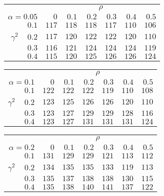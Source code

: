 \begin{tabular}{r|rrrrrr}
\hline\hline
 &\multicolumn{6}{c}{$\rho$} \\ 
 $\alpha = 0.05$ & $0$ & $0.1$ & $0.2$ & $0.3$ & $0.4$ & $0.5$ \\ 
 \hline$0.1$ & $117$ & $118$ & $118$ & $117$ & $110$ & $106$\\ 
$\gamma^2\;\;\;$ $0.2$ & $117$ & $120$ & $122$ & $122$ & $120$ & $110$\\ 
$0.3$ & $116$ & $121$ & $124$ & $124$ & $124$ & $119$\\ 
$0.4$ & $115$ & $120$ & $125$ & $126$ & $126$ & $124$\\ 
 \hline 
 \end{tabular}
 
 \vspace{2em} 
 
\begin{tabular}{r|rrrrrr}
\hline\hline
 &\multicolumn{6}{c}{$\rho$} \\ 
 $\alpha = 0.1$ & $0$ & $0.1$ & $0.2$ & $0.3$ & $0.4$ & $0.5$ \\ 
 \hline$0.1$ & $122$ & $122$ & $122$ & $119$ & $110$ & $108$\\ 
$\gamma^2\;\;\;$ $0.2$ & $123$ & $125$ & $126$ & $126$ & $120$ & $110$\\ 
$0.3$ & $123$ & $127$ & $129$ & $129$ & $128$ & $116$\\ 
$0.4$ & $123$ & $127$ & $131$ & $131$ & $131$ & $124$\\ 
 \hline 
 \end{tabular}
 
 \vspace{2em} 
 
\begin{tabular}{r|rrrrrr}
\hline\hline
 &\multicolumn{6}{c}{$\rho$} \\ 
 $\alpha = 0.2$ & $0$ & $0.1$ & $0.2$ & $0.3$ & $0.4$ & $0.5$ \\ 
 \hline$0.1$ & $131$ & $129$ & $129$ & $121$ & $113$ & $112$\\ 
$\gamma^2\;\;\;$ $0.2$ & $134$ & $135$ & $135$ & $133$ & $119$ & $113$\\ 
$0.3$ & $135$ & $137$ & $138$ & $138$ & $130$ & $115$\\ 
$0.4$ & $135$ & $138$ & $140$ & $141$ & $137$ & $122$\\ 
 \hline 
 \end{tabular}